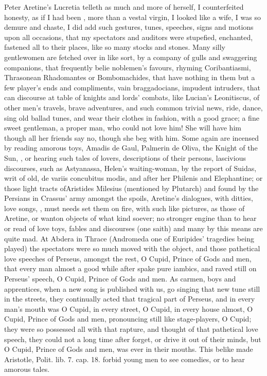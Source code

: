 Peter Aretine's Lucretia telleth as much and more of herself, I
counterfeited honesty, as if I had been , more than a
vestal virgin, I looked like a wife, I was so demure and chaste, I did
add such gestures, tunes, speeches, signs and motions upon all
occasions, that my spectators and auditors were stupefied, enchanted,
fastened all to their places, like so many stocks and stones. Many
silly gentlewomen are fetched over in like sort, by a company of gulls
and swaggering companions, that frequently belie noblemen's favours,
rhyming Coribantiasmi, Thrasonean Rhadomantes or Bombomachides, that
have nothing in them but a few player's ends and compliments, vain
braggadocians, impudent intruders, that can discourse at table of
knights and lords' combats, like Lucian's Leonitiscus, of other
men's travels, brave adventures, and such common trivial news, ride,
dance, sing old ballad tunes, and wear their clothes in fashion, with a
good grace; a fine sweet gentleman, a proper man, who could not love
him! She will have him though all her friends say no, though she beg
with him. Some again are incensed by reading amorous toys, Amadis de
Gaul, Palmerin de Oliva, the Knight of the Sun, \etc{}, or hearing such
tales of lovers, descriptions of their persons, lascivious
discourses, such as Astyanassa, Helen's waiting-woman, by the report of
Suidas, writ of old, de variis concubitus modis, and after her Philenis
and Elephantine; or those light tracts ofAristides Milesius
(mentioned by Plutarch) and found by the Persians in Crassus' army
amongst the spoils, Aretine's dialogues, with ditties, love songs, \etc{},
must needs set them on fire, with such like pictures, as those of
Aretine, or wanton objects of what kind soever; no stronger engine than
to hear or read of love toys, fables and discourses (one saith)
and many by this means are quite mad. At Abdera in Thrace (Andromeda
one of Euripides' tragedies being played) the spectators were so much
moved with the object, and those pathetical love speeches of Perseus,
amongst the rest, O Cupid, Prince of Gods and men, \etc{} that every man
almost a good while after spake pure iambics, and raved still on
Perseus' speech, O Cupid, Prince of Gods and men. As carmen, boys and
apprentices, when a new song is published with us, go singing that new
tune still in the streets, they continually acted that tragical part of
Perseus, and in every man's mouth was O Cupid, in every street, O
Cupid, in every house almost, O Cupid, Prince of Gods and men,
pronouncing still like stage-players, O Cupid; they were so possessed
all with that rapture, and thought of that pathetical love speech, they
could not a long time after forget, or drive it out of their minds, but
O Cupid, Prince of Gods and men, was ever in their mouths. This belike
made Aristotle, Polit. lib. 7. cap. 18. forbid young men to see
comedies, or to hear amorous tales.


